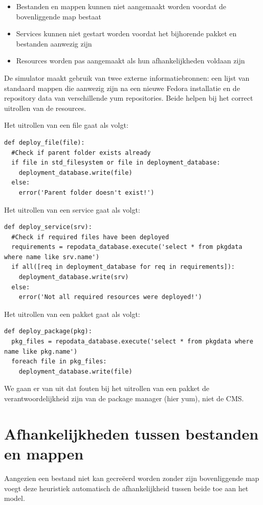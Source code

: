 \begin{itemize}
  \item Bestanden en mappen kunnen niet aangemaakt worden voordat de bovenliggende map bestaat
  \item Services kunnen niet gestart worden voordat het bijhorende pakket en bestanden aanwezig zijn
  \item Resources worden pas aangemaakt als hun afhankelijkheden voldaan zijn
\end{itemize}

De simulator maakt gebruik van twee externe informatiebronnen: een lijst van standaard mappen die aanwezig zijn na een nieuwe Fedora installatie en de repository data van verschillende yum repositories.
Beide helpen bij het correct uitrollen van de resources.

Het uitrollen van een file gaat als volgt:
\begin{lstlisting}[showstringspaces=false]
def deploy_file(file):
  #Check if parent folder exists already
  if file in std_filesystem or file in deployment_database:
    deployment_database.write(file)
  else:
    error('Parent folder doesn't exist!')
\end{lstlisting}

Het uitrollen van een service gaat als volgt: 
\begin{lstlisting}
def deploy_service(srv):
  #Check if required files have been deployed
  requirements = repodata_database.execute('select * from pkgdata where name like srv.name')
  if all([req in deployment_database for req in requirements]):
    deployment_database.write(srv)
  else:
    error('Not all required resources were deployed!')
\end{lstlisting}

Het uitrollen van een pakket gaat als volgt: 
\begin{lstlisting}
def deploy_package(pkg):
  pkg_files = repodata_database.execute('select * from pkgdata where name like pkg.name') 
  foreach file in pkg_files:
    deployment_database.write(file)
\end{lstlisting}
We gaan er van uit dat fouten bij het uitrollen van een pakket de verantwoordelijkheid zijn van de package manager (hier yum), niet de CMS.


\section{Afhankelijkheden tussen bestanden en mappen}
\label{sec:bestanden_en_mappen_eval}
Aangezien een bestand niet kan gecre\"eerd worden zonder zijn bovenliggende map voegt deze heuristiek automatisch de afhankelijkheid tussen beide toe aan het model.

